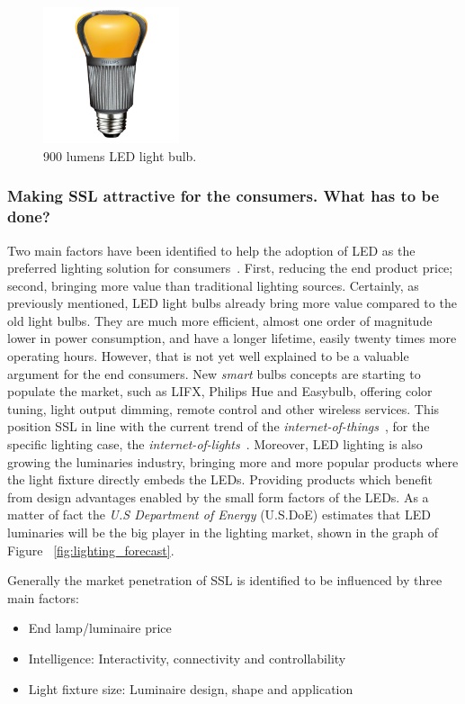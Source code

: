 \vspace{5mm} %


\begin{figure}
\centering
\includegraphics[width=4cm]{./0_intro/img/enduraled-12w.jpg}
\caption{900 lumens LED light bulb.}
\label{fig:l_prize}
\end{figure}

\subsubsection{Making SSL attractive for the consumers. What has to be done? }
Two main factors have been identified to help the adoption of LED as the preferred lighting solution for consumers~\cite{11Voger}. First, reducing the end product price; second, bringing more value than traditional lighting sources. Certainly, as previously mentioned, LED light bulbs already bring more value compared to the old light bulbs. They are much more efficient, almost one order of magnitude lower in power consumption, and have a longer lifetime, easily twenty times more operating hours. However, that is not yet well explained to be a valuable argument for the end consumers. New \emph{smart} bulbs concepts are starting to populate the market, such as LIFX, Philips Hue and Easybulb, offering color tuning, light output dimming, remote control and other wireless services. This position SSL in line with the current trend of the \emph{internet-of-things}~\cite{03Qiu,atzori2010internet,weber2010internet}, for the specific lighting case, the \emph{internet-of-lights}~\cite{14Harbers,web:14Harbers}. Moreover, LED lighting is also growing the luminaries industry, bringing more and more popular products where the light fixture directly embeds the LEDs. Providing products which benefit from design advantages enabled by the small form factors of the LEDs. As a matter of fact the \emph{U.S Department of Energy} (U.S.DoE) estimates that LED luminaries will be the big player in the lighting market, shown in the graph of Figure ~\ref{fig:lighting_forecast}.

Generally the market penetration of SSL is identified to be influenced by three main factors:
\begin{itemize}
  \item End lamp/luminaire price
  \item Intelligence: Interactivity, connectivity and controllability\
  \item Light fixture size: Luminaire design, shape and application
\end{itemize}

